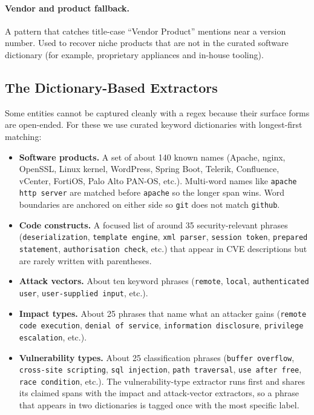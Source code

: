 \documentclass[11pt]{article}
\begin{document}
\paragraph{Vendor and product fallback.}
A pattern that catches title-case ``Vendor Product'' mentions near a
version number. Used to recover niche products that are not in the
curated software dictionary (for example, proprietary appliances and
in-house tooling).

\subsection{The Dictionary-Based Extractors}

Some entities cannot be captured cleanly with a regex because their
surface forms are open-ended. For these we use curated keyword
dictionaries with longest-first matching:

\begin{itemize}
    \item \textbf{Software products.} A set of about 140 known names
    (Apache, nginx, OpenSSL, Linux kernel, WordPress, Spring Boot,
    Telerik, Confluence, vCenter, FortiOS, Palo Alto PAN-OS, etc.).
    Multi-word names like \texttt{apache http server} are matched
    before \texttt{apache} so the longer span wins. Word boundaries
    are anchored on either side so \texttt{git} does not match
    \texttt{github}.
    \item \textbf{Code constructs.} A focused list of around 35
    security-relevant phrases (\texttt{deserialization},
    \texttt{template engine}, \texttt{xml parser},
    \texttt{session token}, \texttt{prepared statement},
    \texttt{authorisation check}, etc.) that appear in CVE
    descriptions but are rarely written with parentheses.
    \item \textbf{Attack vectors.} About ten keyword phrases
    (\texttt{remote}, \texttt{local}, \texttt{authenticated user},
    \texttt{user-supplied input}, etc.).
    \item \textbf{Impact types.} About 25 phrases that name what an
    attacker gains (\texttt{remote code execution},
    \texttt{denial of service}, \texttt{information disclosure},
    \texttt{privilege escalation}, etc.).
    \item \textbf{Vulnerability types.} About 25 classification
    phrases (\texttt{buffer overflow}, \texttt{cross-site scripting},
    \texttt{sql injection}, \texttt{path traversal}, \texttt{use after free},
    \texttt{race condition}, etc.). The vulnerability-type extractor
    runs first and shares its claimed spans with the impact and
    attack-vector extractors, so a phrase that appears in two
    dictionaries is tagged once with the most specific label.
\end{itemize}
\end{document}
